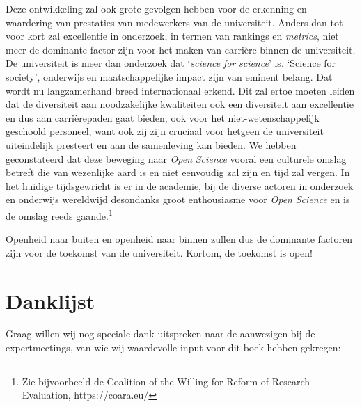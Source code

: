 \documentclass[smallauthor, chapterhaspagenum, nochapterinheader, pagenuminheader,  bigchapnum,medium2, tocpages, garamond, titleinheader]{jote-book}
\begin{document}
	Deze ontwikkeling zal ook grote gevolgen hebben voor de erkenning en waardering van prestaties van medewerkers van de universiteit. Anders dan tot voor kort zal excellentie in onderzoek, in termen van rankings en \emph{metrics}, niet meer de dominante factor zijn voor het maken van carrière binnen de universiteit. De universiteit is meer dan onderzoek dat ‘\emph{science}\emph{ }\emph{for}\emph{ }\emph{science}' is. ‘Science for society', onderwijs en maatschappelijke impact zijn van eminent belang. Dat wordt nu langzamerhand breed internationaal erkend. Dit zal ertoe moeten leiden dat de diversiteit aan noodzakelijke kwaliteiten ook een diversiteit aan excellentie en dus aan carrièrepaden gaat bieden, ook voor het niet-wetenschappelijk geschoold personeel, want ook zij zijn cruciaal voor hetgeen de universiteit uiteindelijk presteert en aan de samenleving kan bieden. We hebben geconstateerd dat deze beweging naar \emph{Open }\emph{Science} vooral een culturele omslag betreft die van wezenlijke aard is en niet eenvoudig zal zijn en tijd zal vergen. In het huidige tijdsgewricht is er in de academie, bij de diverse actoren in onderzoek en onderwijs wereldwijd desondanks groot enthousiasme voor \emph{Open }\emph{Science} en is de omslag reeds gaande.\footnote{Zie bijvoorbeeld de Coalition of the Willing for Reform of Research Evaluation, https://coara.eu/}



	Openheid naar buiten en openheid naar binnen zullen dus de dominante factoren zijn voor de toekomst van de universiteit. Kortom, de toekomst is open!






	\chapter*{Danklijst}

	\nochapterinheader



	Graag willen wij nog speciale dank uitspreken naar de aanwezigen bij de expertmeetings, van wie wij waardevolle input voor dit boek hebben gekregen:



	\vspace*{\baselineskip}
\end{document}
